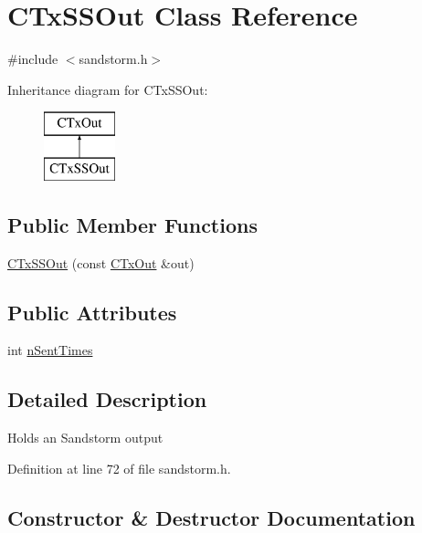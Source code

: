 \hypertarget{class_c_tx_s_s_out}{}\section{C\+Tx\+S\+S\+Out Class Reference}
\label{class_c_tx_s_s_out}


{\ttfamily \#include $<$sandstorm.\+h$>$}

Inheritance diagram for C\+Tx\+S\+S\+Out\+:\begin{figure}[H]
\begin{center}
\leavevmode
\includegraphics[height=2.000000cm]{class_c_tx_s_s_out}
\end{center}
\end{figure}
\subsection*{Public Member Functions}
\begin{DoxyCompactItemize}
\item 
\hyperlink{class_c_tx_s_s_out_afedb8904afca1047c8a46fbd591c7ee4}{C\+Tx\+S\+S\+Out} (const \hyperlink{class_c_tx_out}{C\+Tx\+Out} \&out)
\end{DoxyCompactItemize}
\subsection*{Public Attributes}
\begin{DoxyCompactItemize}
\item 
int \hyperlink{class_c_tx_s_s_out_a53ee4b2b2b26614a055b6946f5b4c267}{n\+Sent\+Times}
\end{DoxyCompactItemize}


\subsection{Detailed Description}
Holds an Sandstorm output 

Definition at line 72 of file sandstorm.\+h.



\subsection{Constructor \& Destructor Documentation}
\hypertarget{class_c_tx_s_s_out_afedb8904afca1047c8a46fbd591c7ee4}{}
